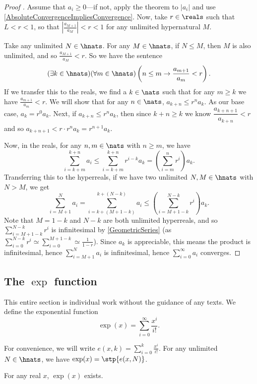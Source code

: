 \begin{proof}[Proof ]
    Assume that $a_i \geq 0$---if not, apply the theorem to $|a_i|$ and use \autoref{AbsoluteConvergenceImpliesConvergence}. Now, take $r \in \reals$ such that $L < r < 1$, so that $\left|\frac{a_{M+1}}{a_M}\right| < r < 1$ for any unlimited hypernatural $M$.

    Take any unlimited $N \in \hnats$. For any $M \in \hnats$, if $N \leq M$, then $M$ is also unlimited, and so $\frac{a_{M+1}}{a_M} < r$. So we have the sentence
    \[ 
    (\exists k \in \hnats)(\forall m \in \hnats)\left(n \leq m \to \frac{a_{m+1}}{a_m} < r\right). 
    \]
    If we transfer this to the reals, we find a $k \in \nats$ such that for any $m \geq k$ we have $\frac{a_{m+1}}{a_m} < r$. We will show that for any $n \in \nats$, $a_{k+n} \leq r^n a_k$. As our base case, $a_k = r^0 a_k$. Next, if $a_{k+n} \leq r^n a_k$, then since $k+n \geq k$ we know $\dfrac{a_{k+n+1}}{a_{k+n}} < r$ and so $a_{k+n+1} < r \cdot r^n a_k = r^{n+1}a_k$.

    Now, in the reals, for any $n, m \in \nats$ with $n \geq m$, we have 
    \[ 
    \sum_{i=k+m}^{k+n} a_i \leq \sum_{i=k+m}^{k+n} r^{i-k} a_k = \left(\sum_{i=m}^n r^i\right) a_k. 
    \]
    Transferring this to the hyperreals, if we have two unlimited $N, M \in \hnats$ with $N > M$, we get
    \[ 
    \sum_{i=M+1}^N a_i = \sum_{i=k+(M+1-k)}^{k+(N-k)} a_i \leq \left(\sum_{i=M+1-k}^{N-k} r^i \right) a_k. 
    \]
    Note that $M=1-k$ and $N-k$ are both unlimited hyperreals, and so $\sum_{i=M+1-k}^{N-k} r^i$ is infinitesimal by \autoref{GeometricSeries} (as $\sum_{i=0}^{N-k} r^i \simeq \sum_{i=0}^{M+1-k} \simeq \frac{1}{1-r}$). Since $a_k$ is appreciable, this means the product is infinitesimal, hence $\sum_{i=M+1}^N a_i$ is infinitesimal, hence $\sum_{i=0}^\infty a_i$ converges.
\end{proof}

\subsection{The \texorpdfstring{$\exp$}{exp} function}
This entire section is individual work without the guidance of any texts. We define the exponential function \[\exp(x) = \sum_{i=0}^\infty \frac{x^i}{i!}.\]

For convenience, we will write $e(x, k) = \sum_{i=0}^k \frac{x^i}{i!}$. For any unlimited $N \in \hnats$, we have $\exp(x) = \stp{e(x, N)}$.

\begin{thm}\label{expExists}
    For any real $x$, $\exp(x)$ exists.
\end{thm}

